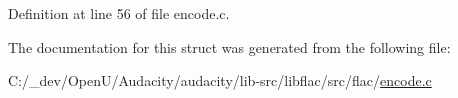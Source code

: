 Definition at line 56 of file encode.\+c.



The documentation for this struct was generated from the following file\+:\begin{DoxyCompactItemize}
\item 
C\+:/\+\_\+dev/\+Open\+U/\+Audacity/audacity/lib-\/src/libflac/src/flac/\hyperlink{libflac_2src_2flac_2encode_8c}{encode.\+c}\end{DoxyCompactItemize}
